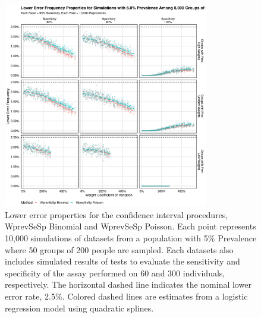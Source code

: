 \documentclass[AMA,STIX1COL]{WileyNJD-v2}
\begin{document}
\begin{figure}
\centering
\includegraphics[width=0.8\textwidth]{figures/imperfect_lower_error_frequency_8000_groups_0_05_prev.pdf}
\caption{Lower error properties for the confidence interval procedures, WprevSeSp Binomial and WprevSeSp Poisson.
Each point represents 10,000 simulations of datasets from a population with 5\% Prevalence where 50 groups of 200 people are sampled.
Each datasets also includes simulated results of tests to evaluate the sensitivity and specificity of the assay performed on 60 and 300 individuals, respectively.
The horizontal dashed line indicates the nominal lower error rate, 2.5\%.
Colored dashed lines are estimates from a logistic regression model using quadratic splines.}
\label{fig:imperfect_lower_error_frequency_8000_groups_0_05_prev}
\end{figure}
\end{document}
